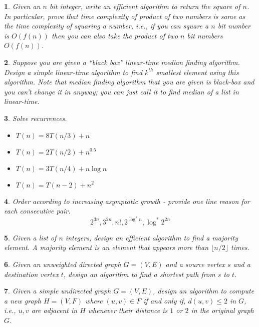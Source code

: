 \documentclass[%
addpoints]{exam}
\theoremstyle{problem}
\newtheorem{p}{}
\begin{document}
\begin{p}
Given an $n$ bit integer, write an efficient algorithm to return the square of $n$. In particular, prove that time complexity of product of two numbers is same as the time complexity of squaring a number, i.e., if you can square a $n$ bit number is $ O(f(n) )$ then you can also take the product of two $n$ bit numbers $ O(f(n) )$.
\hfill \end{p}

\begin{p}
Suppose you are given a ``black box'' linear-time median finding algorithm. Design a simple linear-time algorithm to find $k^{th}$ smallest element using this algorithm. Note that median finding algorithm that you are given is black-box and you can't change it in anyway; you can just call it to find median of a list in linear-time.
\hfill \end{p}

\begin{p}
Solve recurrences.
\hfill \end{p}
\begin{itemize}
			\item $T(n) = 8T(n/3) + n$
			\item $T(n) = 2T(n/2) + n^{0.5}$
			\item $T(n) = 3T(n/4) + n\log n$
			\item $T(n) = T(n-2) + n^2$
\end{itemize} 

\begin{p}
Order according to increasing asymptotic growth - provide one line reason for each consecutive pair.
\[
2^{3n},3^{2n},n!,2^{\log^*n},\log^* 2^{2n}
\]
\hfill \end{p}

\begin{p}
Given a list of $n$ integers, design an efficient algorithm to find a \textit{majority} element. A majority element is an element that appears more than $\lfloor{n/2}\rfloor$ times.
\hfill \end{p}

\begin{p}
Given an unweighted directed graph $G=(V,E)$ and a source vertex $s$ and a destination vertex $t$, design an algorithm to find a shortest path from $s$ to $t$.
\hfill \end{p}

\begin{p}
Given a simple undirected graph $G=(V,E)$, design an algorithm to compute a new graph $H = (V,F)$ where $(u,v)\in F$ \textit{if and only if}, $d(u,v)\le 2$ in $G$, i.e., $u,v$ are adjacent in $H$ whenever their distance is $1$ or $2$ in the original graph $G$.
\hfill \end{p}
\end{document}
